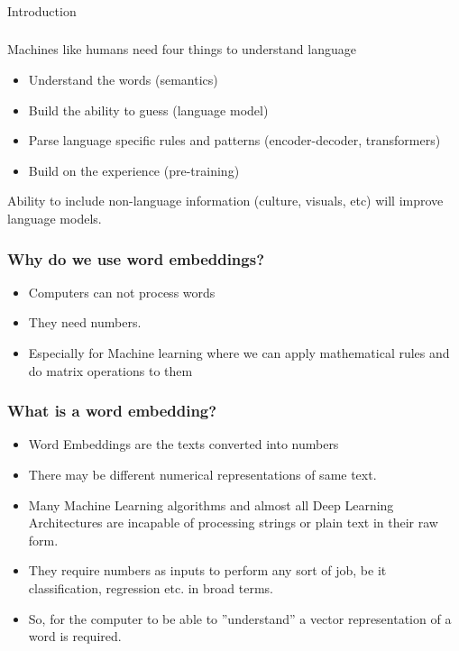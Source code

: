 \begin{frame}[fragile]\frametitle{}

\begin{center}
{\Large Introduction}
\end{center}
\end{frame}

\begin{frame}[fragile]\frametitle{}
Machines like humans need four things to understand language

\begin{itemize}
\item Understand the words (semantics)
\item Build the ability to guess (language model)
\item Parse language specific rules and patterns (encoder-decoder, transformers)
\item Build on the experience (pre-training)
\end{itemize}

Ability to include non-language information (culture, visuals, etc) will improve language models.

\end{frame}

\begin{frame}[fragile]\frametitle{Why do we use word embeddings?}
  \begin{itemize}
    \item Computers can not process words
	\item They need numbers.
	\item Especially for Machine learning where we can apply mathematical rules and do matrix operations to them
  \end{itemize}

\end{frame}


\begin{frame}[fragile]\frametitle{What is a word embedding?}
\begin{itemize}
\item Word Embeddings are the texts converted into numbers
\item There may be different numerical representations of  same text. 
\item Many Machine Learning algorithms and almost all Deep Learning Architectures are incapable of processing strings or plain text in their raw form. 
\item They require numbers as inputs to perform any sort of job, be it classification, regression etc. in broad terms.
\item So, for the computer to be able to ''understand'' a vector representation of a word is required.
\end{itemize}
\end{frame}


